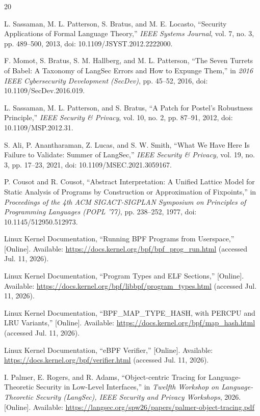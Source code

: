 \documentclass[conference]{IEEEtran}
\begin{document}
\begin{thebibliography}{20}

L. Sassaman, M. L. Patterson, S. Bratus, and M. E. Locasto, ``Security Applications of Formal Language Theory,'' \emph{IEEE Systems Journal}, vol. 7, no. 3, pp. 489--500, 2013, doi: 10.1109/JSYST.2012.2222000.

F. Momot, S. Bratus, S. M. Hallberg, and M. L. Patterson, ``The Seven Turrets of Babel: A Taxonomy of LangSec Errors and How to Expunge Them,'' in \emph{2016 IEEE Cybersecurity Development (SecDev)}, pp. 45--52, 2016, doi: 10.1109/SecDev.2016.019.

L. Sassaman, M. L. Patterson, and S. Bratus, ``A Patch for Postel's Robustness Principle,'' \emph{IEEE Security \& Privacy}, vol. 10, no. 2, pp. 87--91, 2012, doi: 10.1109/MSP.2012.31.

S. Ali, P. Anantharaman, Z. Lucas, and S. W. Smith, ``What We Have Here Is Failure to Validate: Summer of LangSec,'' \emph{IEEE Security \& Privacy}, vol. 19, no. 3, pp. 17--23, 2021, doi: 10.1109/MSEC.2021.3059167.

P. Cousot and R. Cousot, ``Abstract Interpretation: A Unified Lattice Model for Static Analysis of Programs by Construction or Approximation of Fixpoints,'' in \emph{Proceedings of the 4th ACM SIGACT-SIGPLAN Symposium on Principles of Programming Languages (POPL '77)}, pp. 238--252, 1977, doi: 10.1145/512950.512973.

Linux Kernel Documentation, ``Running BPF Programs from Userspace,'' [Online]. Available: \url{https://docs.kernel.org/bpf/bpf_prog_run.html} (accessed Jul. 11, 2026).

Linux Kernel Documentation, ``Program Types and ELF Sections,'' [Online]. Available: \url{https://docs.kernel.org/bpf/libbpf/program_types.html} (accessed Jul. 11, 2026).

Linux Kernel Documentation, ``BPF\_MAP\_TYPE\_HASH, with PERCPU and LRU Variants,'' [Online]. Available: \url{https://docs.kernel.org/bpf/map_hash.html} (accessed Jul. 11, 2026).

Linux Kernel Documentation, ``eBPF Verifier,'' [Online]. Available: \url{https://docs.kernel.org/bpf/verifier.html} (accessed Jul. 11, 2026).

I. Palmer, E. Rogers, and R. Adams, ``Object-centric Tracing for Language-Theoretic Security in Low-Level Interfaces,'' in \emph{Twelfth Workshop on Language-Theoretic Security (LangSec), IEEE Security and Privacy Workshops}, 2026. [Online]. Available: \url{https://langsec.org/spw26/papers/palmer-object-tracing.pdf}


\end{thebibliography}
\end{document}
